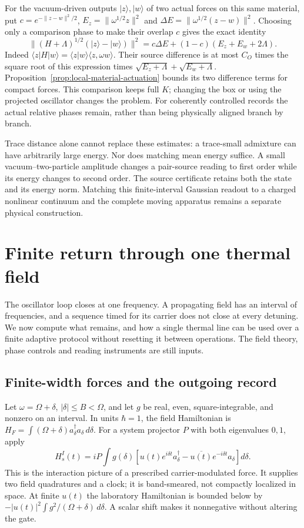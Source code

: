 For the vacuum-driven outputs $|z\rangle,|w\rangle$ of two actual
forces on this same material, put $c=e^{-\|z-w\|^2/2}$,
$E_z=\|\omega^{1/2}z\|^2$ and
$\Delta E=\|\omega^{1/2}(z-w)\|^2$.
Choosing only a comparison phase to make their overlap $c$ gives
the exact identity
\[
 \|(H+\Lambda)^{1/2}(|z\rangle-|w\rangle)\|^2
       =c\Delta E+(1-c)(E_z+E_w+2\Lambda).
\]
Indeed $\langle z|H|w\rangle=\langle z|w\rangle
\langle z,\omega w\rangle$.
Their source difference is at most $C_O$ times the square root of
this expression times
$\sqrt{E_z+\Lambda}+\sqrt{E_w+\Lambda}$.
Proposition~\ref{prop:local-material-actuation} bounds its two
difference terms for compact forces. This comparison keeps full $K$;
changing the box or using the projected oscillator changes the
problem. For coherently controlled records the actual relative
phases remain, rather than being physically aligned branch by branch.

Trace distance alone cannot replace these estimates: a trace-small
admixture can have arbitrarily large energy. Nor does matching mean
energy suffice. A small vacuum--two-particle amplitude changes a
pair-source reading to first order while its energy changes to second
order. The source certificate retains both the state and its energy
norm. Matching this finite-interval Gaussian readout to a charged
nonlinear continuum and the complete moving apparatus remains a
separate physical construction.

\section{Finite return through one thermal field}
\label{sec:thermal-return}

The oscillator loop closes at one frequency. A propagating field has an
interval of frequencies, and a sequence timed for its carrier does not
close at every detuning. We now compute what remains, and how a single
thermal line can be used over a finite adaptive protocol without resetting
it between operations. The field theory, phase controls and reading
instruments are still inputs.

\subsection{Finite-width forces and the outgoing record}

Let $\omega=\Omega+\delta$, $|\delta|\le B<\Omega$, and let $g$ be real,
even, square-integrable, and nonzero on an interval. In units $\hbar=1$,
the field Hamiltonian is
$H_F=\int(\Omega+\delta)a_\delta^\dagger a_\delta\,d\delta$.
For a system projector $P$ with both eigenvalues $0,1$, apply
\begin{equation}\label{eq:line-source}
 H_s^I(t)=iP\int g(\delta)
 \left[u(t)e^{i\delta t}a_\delta^\dagger
       -\overline{u(t)}e^{-i\delta t}a_\delta\right]d\delta .
\end{equation}
This is the interaction picture of a prescribed carrier-modulated
force. It supplies two field quadratures and a clock; it is band-smeared,
not compactly localized in space. At finite $u(t)$ the laboratory
Hamiltonian is bounded below by
$-|u(t)|^2\int g^2/(\Omega+\delta)\,d\delta$.
A scalar shift makes it nonnegative without altering the gate.

